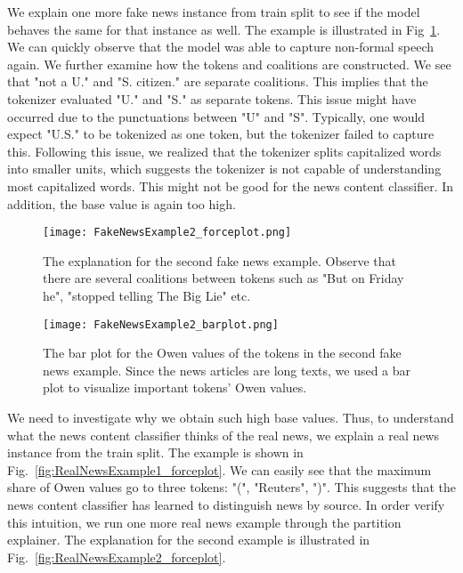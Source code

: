 We explain one more fake news instance from train split to see if the model behaves the same for that instance as well. The example is illustrated in Fig~\ref{fig:FakeNewsExample2_forceplot}. We can quickly observe that the model was able to capture non-formal speech again. We further examine how the tokens and coalitions are constructed. We see that "not a U." and "S. citizen." are separate coalitions. This implies that the tokenizer evaluated "U." and "S." as separate tokens. This issue might have occurred due to the punctuations between "U" and "S". Typically, one would expect "U.S." to be tokenized as one token, but the tokenizer failed to capture this. Following this issue, we realized that the tokenizer splits capitalized words into smaller units, which suggests the tokenizer is not capable of understanding most capitalized words. This might not be good for the news content classifier. In addition, the base value is again too high.\\
\begin{figure}
    \centering
    \texttt{[image: FakeNewsExample2\_forceplot.png]}
    \caption[The explanation for the second fake news example.]{The explanation for the second fake news example. Observe that there are several coalitions between tokens such as "But on Friday he", "stopped telling The Big Lie" etc.}
    \label{fig:FakeNewsExample2_forceplot}
\end{figure}
\begin{figure}
    \centering
    \texttt{[image: FakeNewsExample2\_barplot.png]}
    \caption[The bar plot for the Owen values of the tokens in the second fake news example.]{The bar plot for the Owen values of the tokens in the second fake news example.  Since the news articles are long texts, we used a bar plot to visualize important tokens' Owen values.}
\end{figure}
We need to investigate why we obtain such high base values. Thus, to understand what the news content classifier thinks of the real news, we explain a real news instance from the train split. The example is shown in Fig.~\ref{fig:RealNewsExample1_forceplot}. We can easily see that the maximum share of Owen values go to three tokens: "(", "Reuters", ")". This suggests that the news content classifier has learned to distinguish news by source. In order verify this intuition, we run one more real news example through the partition explainer. The explanation for the second example is illustrated in Fig.~\ref{fig:RealNewsExample2_forceplot}.\\

